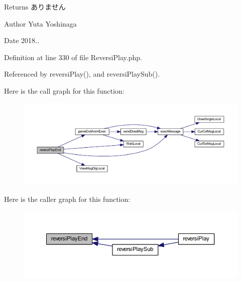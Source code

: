 \begin{DoxyReturn}{Returns}
ありません 
\end{DoxyReturn}
\begin{DoxyAuthor}{Author}
Yuta Yoshinaga 
\end{DoxyAuthor}
\begin{DoxyDate}{Date}
2018.. 
\end{DoxyDate}


Definition at line 330 of file Reversi\+Play.\+php.



Referenced by reversi\+Play(), and reversi\+Play\+Sub().

Here is the call graph for this function\+:
\nopagebreak
\begin{figure}[H]
\begin{center}
\leavevmode
\includegraphics[width=350pt]{class_reversi_play_af55fe6b6f2005c7da80c696ed692783d_cgraph}
\end{center}
\end{figure}
Here is the caller graph for this function\+:
\nopagebreak
\begin{figure}[H]
\begin{center}
\leavevmode
\includegraphics[width=350pt]{class_reversi_play_af55fe6b6f2005c7da80c696ed692783d_icgraph}
\end{center}
\end{figure}
\mbox{\label{class_reversi_play_a67816fe65a87e35d8e8cc35d5d269bcb}} 
